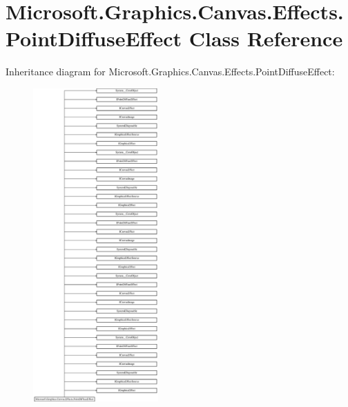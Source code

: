 \hypertarget{class_microsoft_1_1_graphics_1_1_canvas_1_1_effects_1_1_point_diffuse_effect}{}\section{Microsoft.\+Graphics.\+Canvas.\+Effects.\+Point\+Diffuse\+Effect Class Reference}
\label{class_microsoft_1_1_graphics_1_1_canvas_1_1_effects_1_1_point_diffuse_effect}
Inheritance diagram for Microsoft.\+Graphics.\+Canvas.\+Effects.\+Point\+Diffuse\+Effect\+:\begin{figure}[H]
\begin{center}
\leavevmode
\includegraphics[height=12.000000cm]{class_microsoft_1_1_graphics_1_1_canvas_1_1_effects_1_1_point_diffuse_effect}
\end{center}
\end{figure}
